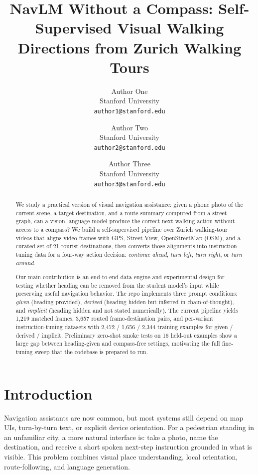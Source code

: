 \documentclass[10pt,twocolumn,letterpaper]{article}
\begin{document}
\title{NavLM Without a Compass: Self-Supervised Visual Walking Directions from Zurich Walking Tours}

\author{Author One\\
Stanford University\\
{\tt\small author1@stanford.edu}
\and
Author Two\\
Stanford University\\
{\tt\small author2@stanford.edu}
\and
Author Three\\
Stanford University\\
{\tt\small author3@stanford.edu}
}

\maketitle

\begin{abstract}
We study a practical version of visual navigation assistance: given a phone photo of the current scene, a target destination, and a route summary computed from a street graph, can a vision-language model produce the correct next walking action without access to a compass? We build a self-supervised pipeline over Zurich walking-tour videos that aligns video frames with GPS, Street View, OpenStreetMap (OSM), and a curated set of 21 tourist destinations, then converts those alignments into instruction-tuning data for a four-way action decision: \textit{continue ahead}, \textit{turn left}, \textit{turn right}, or \textit{turn around}.

Our main contribution is an end-to-end data engine and experimental design for testing whether heading can be removed from the student model's input while preserving useful navigation behavior. The repo implements three prompt conditions: \textit{given} (heading provided), \textit{derived} (heading hidden but inferred in chain-of-thought), and \textit{implicit} (heading hidden and not stated numerically). The current pipeline yields 1,219 matched frames, 3,657 routed frame-destination pairs, and per-variant instruction-tuning datasets with 2,472 / 1,656 / 2,344 training examples for given / derived / implicit. Preliminary zero-shot smoke tests on 16 held-out examples show a large gap between heading-given and compass-free settings, motivating the full fine-tuning sweep that the codebase is prepared to run.
\end{abstract}

\section{Introduction}
Navigation assistants are now common, but most systems still depend on map UIs, turn-by-turn text, or explicit device orientation. For a pedestrian standing in an unfamiliar city, a more natural interface is: take a photo, name the destination, and receive a short spoken next-step instruction grounded in what is visible. This problem combines visual place understanding, local orientation, route-following, and language generation.
\end{document}

